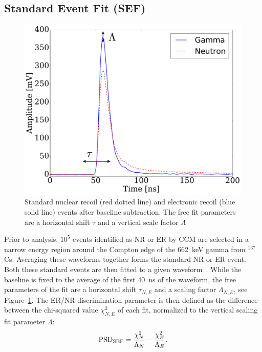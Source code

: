 \subsection{Standard Event Fit (SEF)}

\begin{figure}[htbp]
\centering
    \includegraphics[width=\columnwidth]{figures/psd/fig_standardevents}
    \caption{Standard nuclear recoil (red dotted line) and electronic recoil (blue solid line) events after baseline subtraction. The free fit parameters are a horizontal shift $\tau$ and a vertical scale factor $\Lambda$}\label{fig:stdevents}
\end{figure}

Prior to analysis, $10^5$ events identified as NR or ER by CCM are selected in a narrow energy region around the Compton edge of the 662~keV gamma from $^{137}$Cs. Averaging these waveforms together forms the standard NR or ER event. Both these standard events are then fitted to a given waveform~\cite{Guerrero:2008,Ambers:2011}. While the baseline is fixed to the average of the first 40~ns of the waveform, the free parameters of the fit are a horizontal shift $\tau_{N,E}$ and a scaling factor $\Lambda_{N,E}$, see Figure~\ref{fig:stdevents}. The ER/NR discrimination parameter is then defined as the difference between the chi-squared value $\chi^2_{N,E}$ of each fit, normalized to the vertical scaling fit parameter $\Lambda$:
\begin{equation}
\mathrm{PSD}_{\mathrm{SEF}} = \frac{\chi^2_N}{\Lambda_N} - \frac{\chi^2_E}{\Lambda_E}.
\end{equation}


